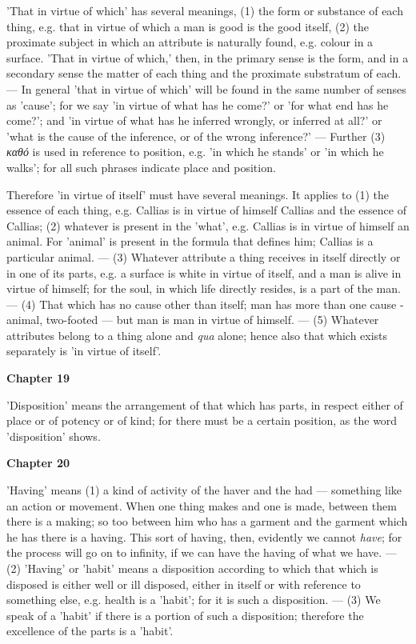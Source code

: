 'That in virtue of which' has several meanings, (1) the form or substance of each thing, e.g. that in virtue of which a man is good is the good itself, (2) the proximate subject in which an attribute is naturally found, e.g. colour in a surface. 'That in virtue of which,' then, in the primary sense is the form, and in a secondary sense the matter of each thing and the proximate substratum of each. — In general 'that in virtue of which' will be found in the same number of senses as 'cause'; for we say 'in virtue of what has he come?' or 'for what end has he come?'; and 'in virtue of what has he inferred wrongly, or inferred at all?' or 'what is the cause of the inference, or of the wrong inference?' — Further (3) \emph{καθό} is used in reference to position, e.g. 'in which he stands' or 'in which he walks'; for all such phrases indicate place and position.

Therefore 'in virtue of itself' must have several meanings. It applies to (1) the essence of each thing, e.g. Callias is in virtue of himself Callias and the essence of Callias; (2) whatever is present in the 'what', e.g. Callias is in virtue of himself an animal. For 'animal' is present in the formula that defines him; Callias is a particular animal. — (3) Whatever attribute a thing receives in itself directly or in one of its parts, e.g. a surface is white in virtue of itself, and a man is alive in virtue of himself; for the soul, in which life directly resides, is a part of the man. — (4) That which has no cause other than itself; man has more than one cause - animal, two-footed — but man is man in virtue of himself. — (5) Whatever attributes belong to a thing alone and \emph{qua} alone; hence also that which exists separately is 'in virtue of itself'.

\textbf{Chapter 19}

'Disposition' means the arrangement of that which has parts, in respect either of place or of potency or of kind; for there must be a certain position, as the word 'disposition' shows.

\textbf{Chapter 20}

'Having' means (1) a kind of activity of the haver and the had — something like an action or movement. When one thing makes and one is made, between them there is a making; so too between him who has a garment and the garment which he has there is a having. This sort of having, then, evidently we cannot \emph{have}; for the process will go on to infinity, if we can have the having of what we have. — (2) 'Having' or 'habit' means a disposition according to which that which is disposed is either well or ill disposed, either in itself or with reference to something else, e.g. health is a 'habit'; for it is such a disposition. — (3) We speak of a 'habit' if there is a portion of such a disposition; therefore the excellence of the parts is a 'habit'.

